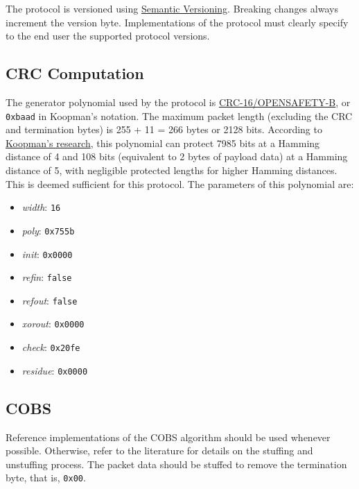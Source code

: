 \documentclass[a4paper,11pt,english]{article}
\begin{document}
The protocol is versioned using \href{https://semver.org/}{Semantic Versioning}. Breaking changes always increment the version byte. Implementations of the protocol must clearly specify to the end user the supported protocol versions.

\subsection[i:crc]{CRC Computation}

The generator polynomial used by the protocol is \href{https://reveng.sourceforge.io/crc-catalogue/all.htm#crc.cat.crc-16-opensafety-b}{CRC-16/OPENSAFETY-B}, or \texttt{0xbaad} in Koopman's notation. The maximum packet length (excluding the CRC and termination bytes) is 255 + 11 = 266 bytes or 2128 bits. According to \href{https://users.ece.cmu.edu/~koopman/crc/c16/0xbaad_len.txt}{Koopman's research}, this polynomial can protect 7985 bits at a Hamming distance of 4 and 108 bits (equivalent to 2 bytes of payload data) at a Hamming distance of 5, with negligible protected lengths for higher Hamming distances. This is deemed sufficient for this protocol. The parameters of this polynomial are:

\begin{itemize}
  \item \textit{width}: \texttt{16}
  \item \textit{poly}: \texttt{0x755b}
  \item \textit{init}: \texttt{0x0000}
  \item \textit{refin}: \texttt{false}
  \item \textit{refout}: \texttt{false}
  \item \textit{xorout}: \texttt{0x0000}
  \item \textit{check}: \texttt{0x20fe}
  \item \textit{residue}: \texttt{0x0000}
\end{itemize}

\subsection[i:cobs]{COBS}
Reference implementations of the COBS algorithm should be used whenever possible. Otherwise, refer to the literature for details on the stuffing and unstuffing process. The packet data should be stuffed to remove the termination byte, that is, \texttt{0x00}.
\end{document}
